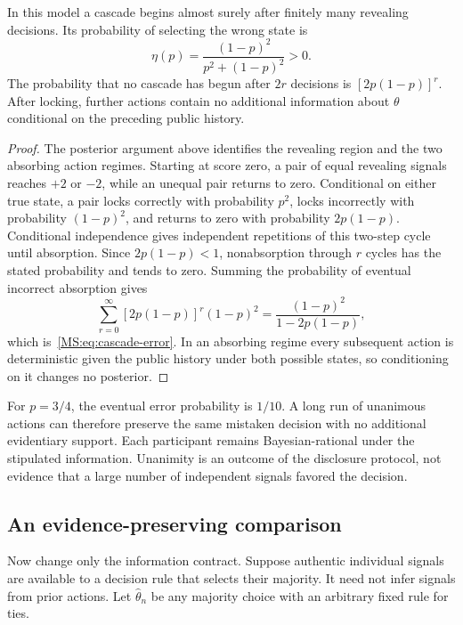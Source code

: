 \begin{MSproposition}\label{MS:prop:cascade-lock}
In this model a cascade begins almost surely after finitely many revealing decisions. Its probability of selecting the wrong state is
\begin{equation}\label{MS:eq:cascade-error}
\eta(p)=\frac{(1-p)^2}{p^2+(1-p)^2}>0.
\end{equation}
The probability that no cascade has begun after $2r$ decisions is $[2p(1-p)]^r$. After locking, further actions contain no additional information about $\theta$ conditional on the preceding public history.
\end{MSproposition}
\begin{proof}
The posterior argument above identifies the revealing region and the two absorbing action regimes. Starting at score zero, a pair of equal revealing signals reaches $+2$ or $-2$, while an unequal pair returns to zero. Conditional on either true state, a pair locks correctly with probability $p^2$, locks incorrectly with probability $(1-p)^2$, and returns to zero with probability $2p(1-p)$. Conditional independence gives independent repetitions of this two-step cycle until absorption. Since $2p(1-p)<1$, nonabsorption through $r$ cycles has the stated probability and tends to zero. Summing the probability of eventual incorrect absorption gives
\[
\sum_{r=0}^{\infty}[2p(1-p)]^r(1-p)^2
=\frac{(1-p)^2}{1-2p(1-p)},
\]
which is~\eqref{MS:eq:cascade-error}. In an absorbing regime every subsequent action is deterministic given the public history under both possible states, so conditioning on it changes no posterior.
\end{proof}

For $p=3/4$, the eventual error probability is $1/10$. A long run of unanimous actions can therefore preserve the same mistaken decision with no additional evidentiary support. Each participant remains Bayesian-rational under the stipulated information. Unanimity is an outcome of the disclosure protocol, not evidence that a large number of independent signals favored the decision.

\subsection{An evidence-preserving comparison}
Now change only the information contract. Suppose authentic individual signals are available to a decision rule that selects their majority. It need not infer signals from prior actions. Let $\widehat\theta_n$ be any majority choice with an arbitrary fixed rule for ties.

